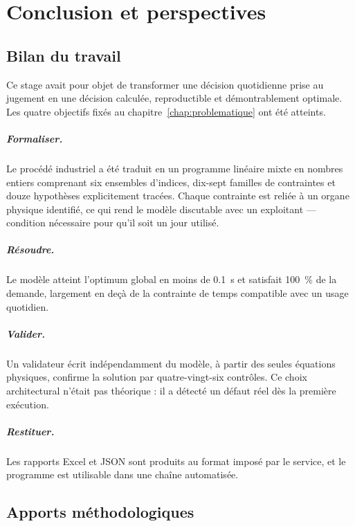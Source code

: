 \chapter{Conclusion et perspectives}
\label{chap:conclusion}

\section{Bilan du travail}

Ce stage avait pour objet de transformer une décision quotidienne prise au jugement en une
décision calculée, reproductible et démontrablement optimale. Les quatre objectifs fixés au
chapitre~\ref{chap:problematique} ont été atteints.

\paragraph{Formaliser.} Le procédé industriel a été traduit en un programme linéaire mixte
en nombres entiers comprenant six ensembles d'indices, dix-sept familles de contraintes et
douze hypothèses explicitement tracées. Chaque contrainte est reliée à un organe physique
identifié, ce qui rend le modèle discutable avec un exploitant --- condition nécessaire pour
qu'il soit un jour utilisé.

\paragraph{Résoudre.} Le modèle atteint l'optimum global en moins de \SI{0.1}{\second} et satisfait
\SI{100}{\percent} de la demande, largement en deçà de la contrainte de temps compatible avec
un usage quotidien.

\paragraph{Valider.} Un validateur écrit indépendamment du modèle, à partir des seules
équations physiques, confirme la solution par quatre-vingt-six contrôles. Ce choix
architectural n'était pas théorique : il a détecté un défaut réel dès la première exécution.

\paragraph{Restituer.} Les rapports Excel et JSON sont produits au format imposé par le
service, et le programme est utilisable dans une chaîne automatisée.

\section{Apports méthodologiques}

